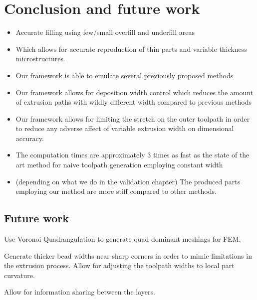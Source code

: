\section{Conclusion and future work}

\begin{itemize}
\item Accurate filling using few/small overfill and underfill areas
\item Which allows for accurate reproduction of thin parts and variable thickness microstructures.
\item Our framework is able to emulate several previously proposed methods
\item Our framework allows for deposition width control which reduces the amount of extrusion paths with wildly different width compared to previous methods
\item Our framework allows for limiting the stretch on the outer toolpath in order to reduce any adverse affect of variable extrusion width on dimensional accuracy.
\item The computation times are approximately 3 times as fast as the state of the art method for naive toolpath generation employing constant width
\item (depending on what we do in the validation chapter) The produced parts employing our method are more stiff compared to other methods.
\end{itemize}



\subsection{Future work}
Use Voronoi Quadrangulation to generate quad dominant meshings for FEM.

Generate thicker bead widths near sharp corners in order to mimic limitations in the extrusion process.
Allow for adjusting the toolpath widths to local part curvature.

Allow for information sharing between the layers.